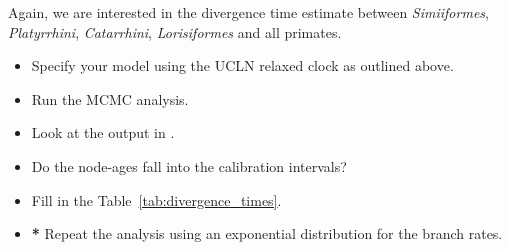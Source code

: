 Again, we are interested in the divergence time estimate between \emph{Simiiformes}, \emph{Platyrrhini}, \emph{Catarrhini}, \emph{Lorisiformes} and all primates.

\begin{itemize}
\item Specify your model using the UCLN relaxed clock as outlined above.
\item Run the MCMC analysis.
\item Look at the output in \Tracer.
\item Do the node-ages fall into the calibration intervals?
\item Fill in the Table~\ref{tab:divergence_times}.
\item \textbf{*} Repeat the analysis using an exponential distribution for the branch rates.
\end{itemize}



